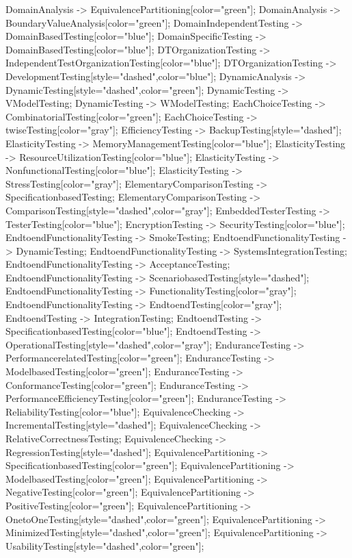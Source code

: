 \documentclass{article}
\begin{document}
{DomainAnalysis -> EquivalencePartitioning[color="green"];
DomainAnalysis -> BoundaryValueAnalysis[color="green"];
DomainIndependentTesting -> DomainBasedTesting[color="blue"];
DomainSpecificTesting -> DomainBasedTesting[color="blue"];
DTOrganizationTesting -> IndependentTestOrganizationTesting[color="blue"];
DTOrganizationTesting -> DevelopmentTesting[style="dashed",color="blue"];
DynamicAnalysis -> DynamicTesting[style="dashed",color="green"];
DynamicTesting -> VModelTesting;
DynamicTesting -> WModelTesting;
EachChoiceTesting -> CombinatorialTesting[color="green"];
EachChoiceTesting -> twiseTesting[color="gray"];
EfficiencyTesting -> BackupTesting[style="dashed"];
ElasticityTesting -> MemoryManagementTesting[color="blue"];
ElasticityTesting -> ResourceUtilizationTesting[color="blue"];
ElasticityTesting -> NonfunctionalTesting[color="blue"];
ElasticityTesting -> StressTesting[color="gray"];
ElementaryComparisonTesting -> SpecificationbasedTesting;
ElementaryComparisonTesting -> ComparisonTesting[style="dashed",color="gray"];
EmbeddedTesterTesting -> TesterTesting[color="blue"];
EncryptionTesting -> SecurityTesting[color="blue"];
EndtoendFunctionalityTesting -> SmokeTesting;
EndtoendFunctionalityTesting -> DynamicTesting;
EndtoendFunctionalityTesting -> SystemsIntegrationTesting;
EndtoendFunctionalityTesting -> AcceptanceTesting;
EndtoendFunctionalityTesting -> ScenariobasedTesting[style="dashed"];
EndtoendFunctionalityTesting -> FunctionalityTesting[color="gray"];
EndtoendFunctionalityTesting -> EndtoendTesting[color="gray"];
EndtoendTesting -> IntegrationTesting;
EndtoendTesting -> SpecificationbasedTesting[color="blue"];
EndtoendTesting -> OperationalTesting[style="dashed",color="gray"];
EnduranceTesting -> PerformancerelatedTesting[color="green"];
EnduranceTesting -> ModelbasedTesting[color="green"];
EnduranceTesting -> ConformanceTesting[color="green"];
EnduranceTesting -> PerformanceEfficiencyTesting[color="green"];
EnduranceTesting -> ReliabilityTesting[color="blue"];
EquivalenceChecking -> IncrementalTesting[style="dashed"];
EquivalenceChecking -> RelativeCorrectnessTesting;
EquivalenceChecking -> RegressionTesting[style="dashed"];
EquivalencePartitioning -> SpecificationbasedTesting[color="green"];
EquivalencePartitioning -> ModelbasedTesting[color="green"];
EquivalencePartitioning -> NegativeTesting[color="green"];
EquivalencePartitioning -> PositiveTesting[color="green"];
EquivalencePartitioning -> OnetoOneTesting[style="dashed",color="green"];
EquivalencePartitioning -> MinimizedTesting[style="dashed",color="green"];
EquivalencePartitioning -> UsabilityTesting[style="dashed",color="green"];
}
\end{document}
